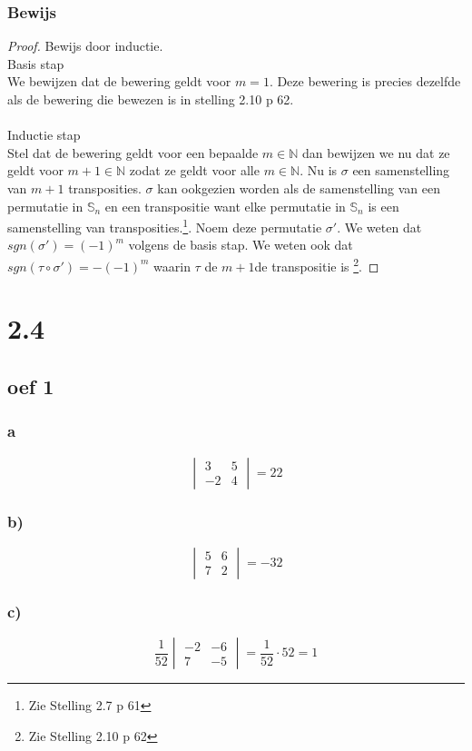 \documentclass[lineaire_algebra_oplossingen.tex]{subfiles}
\begin{document}
\subsubsection*{Bewijs}
\begin{proof}
Bewijs door inductie.\\
\textsf{Basis stap}\\
We bewijzen dat de bewering geldt voor $m=1$. Deze bewering is precies dezelfde als de bewering die bewezen is in stelling 2.10 p 62.\\\\
\textsf{Inductie stap}\\
Stel dat de bewering geldt voor een bepaalde $m \in \mathbb{N}$ dan bewijzen we nu dat ze geldt voor $m+1 \in \mathbb{N}$ zodat ze geldt voor alle $m \in \mathbb{N}$.
Nu is $\sigma$ een samenstelling van $m+1$ transposities. $\sigma$ kan ookgezien worden als de samenstelling van een permutatie in $\mathbb{S}_n$ en een transpositie want elke permutatie in $\mathbb{S}_n$ is een samenstelling van transposities.\footnote{Zie Stelling 2.7 p 61}. Noem deze permutatie $\sigma'$. We weten dat $sgn(\sigma') = (-1)^m$ volgens de basis stap. We weten ook dat $sgn(\tau \circ \sigma') = -(-1)^m$ waarin $\tau$ de $m+1$de transpositie is \footnote{Zie Stelling 2.10 p 62}.
\end{proof}


\section{2.4}
\subsection{oef 1}
\subsubsection*{a}
\[
\begin{vmatrix}
3 & 5\\
-2 & 4
\end{vmatrix}
= 22
\]
\subsubsection*{b)}
\[
\begin{vmatrix}
5 & 6\\
7 & 2
\end{vmatrix}
= -32
\]
\subsubsection*{c)}
\[
    \frac{1}{52} \begin{vmatrix}
        -2 & -6\\
        7 & -5
    \end{vmatrix} 
    = \frac{1}{52} \cdot 52 = 1
\]
\end{document}
